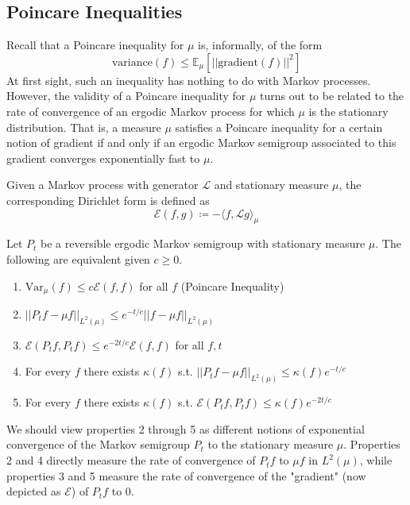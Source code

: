 \subsection{Poincare Inequalities}

  Recall that a Poincare inequality for $\mu$ is, informally, of the form 
  \[\mathrm{variance}(f) \leq \mathbb{E}_\mu[ ||\mathrm{gradient}(f)||^2 ]\]
  At first sight, such an inequality has nothing to do with Markov processes. However, the validity of a Poincare inequality for $\mu$ turns out to be related to the rate of convergence of an ergodic Markov process for which $\mu$ is the stationary distribution. That is, a measure $\mu$ satisfies a Poincare inequality for a certain notion of gradient if and only if an ergodic Markov semigroup associated to this gradient converges exponentially fast to $\mu$. 

  \begin{definition}
  Given a Markov process with generator $\mathscr{L}$ and stationary measure $\mu$, the corresponding Dirichlet form is defined as 
  \[\mathcal{E}(f, g) \coloneqq - \langle f, \mathscr{L} g \rangle_\mu\]
  \end{definition}

  \begin{theorem}
  Let $P_t$ be a reversible ergodic Markov semigroup with stationary measure $\mu$. The following are equivalent given $c \geq 0$. 
  \begin{enumerate}
      \item $\mathrm{Var}_\mu (f) \leq c \mathcal{E}(f, f)$ for all $f$ (Poincare Inequality) 
      \item $||P_t f - \mu f||_{L^2 (\mu)} \leq e^{-t /c} ||f - \mu f||_{L^2 (\mu)}$
      \item $\mathcal{E}(P_t f, P_t f) \leq e^{-2t /c} \mathcal{E}(f, f)$ for all $f, t$
      \item For every $f$ there exists $\kappa (f)$ s.t. $||P_t f - \mu f||_{L^2 (\mu)} \leq \kappa(f) e^{-t/c}$
      \item For every $f$ there exists $\kappa (f)$ s.t. $\mathcal{E}(P_t f, P_t f) \leq \kappa(f) e^{-2t/c}$ 
  \end{enumerate}
  \end{theorem}

  We should view properties 2 through 5 as different notions of exponential convergence of the Markov semigroup $P_t$ to the stationary measure $\mu$. Properties 2 and 4 directly measure the rate of convergence of $P_t f$ to $\mu f$ in $L^2 (\mu)$, while properties 3 and 5 measure the rate of convergence of the "gradient" (now depicted as $\mathcal{E}$) of $P_t f$ to $0$. 

